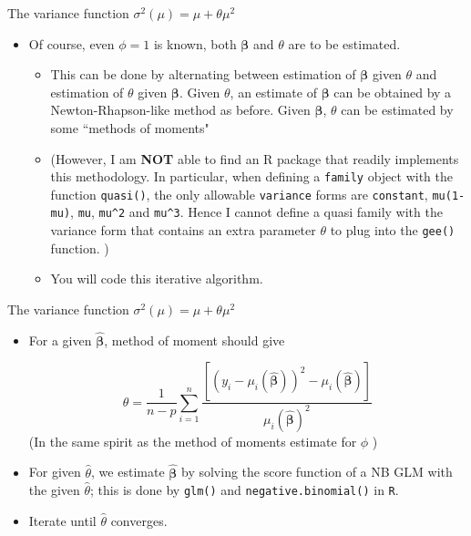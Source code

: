 \documentclass{beamer}
\newcommand{\boldbeta}{{\boldsymbol \beta}}
\newenvironment{wideitemize}%
  {\begin{itemize}%
    \setlength{\parskip}{1em}}%
  {\end{itemize}}
\begin{document}
\begin{frame}{The variance function $\sigma^2 (\mu)= \mu + \theta \mu^2 $}

\begin{wideitemize}

\item Of course, even $\phi = 1$ is known, both $\boldbeta$ and $\theta$ are to be estimated.

\begin{wideitemize}
\item This can be done by alternating between estimation of $\boldbeta$ given $\theta$ and estimation of $\theta$ given $\boldbeta$. Given $\theta$, an estimate of $\boldbeta$ can be obtained by a Newton-Rhapson-like method as before. Given $\boldbeta$, $\theta$ can be estimated by some ``methods of moments" 


\item (However, I am {\bf NOT} able to find an R package that readily implements this methodology. In particular, when defining a \texttt{family} object with the function \texttt{quasi()}, the only allowable \texttt{variance} forms are \texttt{constant}, \texttt{mu(1-mu)}, \texttt{mu}, 
\texttt{mu\^{}2} and \texttt{mu\^{}3}. Hence I cannot define a quasi family with the variance form that contains an extra parameter $\theta$ to plug into the \texttt{gee()} function. )

\item You will code this iterative algorithm.
\end{wideitemize}


\end{wideitemize}



\end{frame}

\begin{frame} {The variance function $\sigma^2 (\mu)= \mu + \theta \mu^2 $}
\begin{wideitemize}
\item  For a given $\hat{\boldbeta}$, method of moment should give

\[
\hat{\theta} = \frac{1}{n - p} \sum_{i = 1}^n \frac{[(y_i - \mu_i (\hat{\boldbeta}))^2 -  \mu_i (\hat{\boldbeta})]}{ \mu_i (\hat{\boldbeta})^2}
\]
(In the same spirit as the method of moments estimate for $\phi$ )
\item For given $\hat{\theta}$, we estimate $\hat{\boldbeta}$ by solving the score function of a NB GLM with the given $\hat{\theta}$; this is done by \texttt{glm()} and \texttt{negative.binomial()} in \texttt{R}. 

\item Iterate until $\hat{\theta}$ converges.

\end{wideitemize}

\end{frame}
\end{document}
